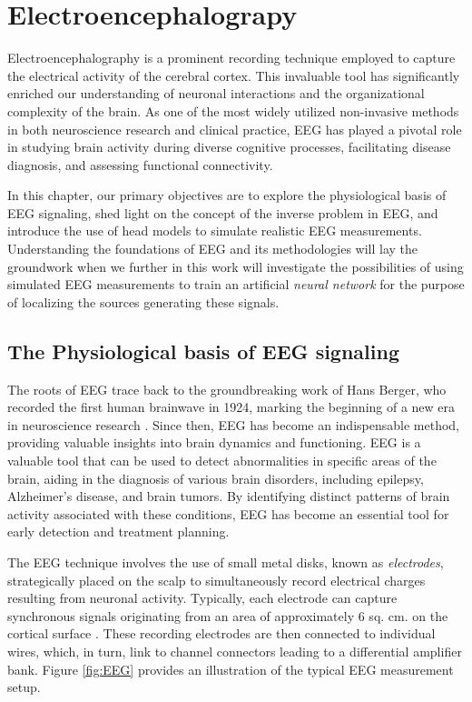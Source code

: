 \documentclass[a4paper, UKenglish, 11pt]{uiomaster}
\begin{document}
\chapter{Electroencephalograpy} \label{chap:eeg}
Electroencephalography is a prominent recording technique employed to capture the electrical activity of the cerebral cortex. This invaluable tool has significantly enriched our understanding of neuronal interactions and the organizational complexity of the brain. As one of the most widely utilized non-invasive methods in both neuroscience research and clinical practice, EEG has played a pivotal role in studying brain activity during diverse cognitive processes, facilitating disease diagnosis, and assessing functional connectivity.

In this chapter, our primary objectives are to explore the physiological basis of EEG signaling, shed light on the concept of the inverse problem in EEG, and introduce the use of head models to simulate realistic EEG measurements. Understanding the foundations of EEG and its methodologies will lay the groundwork when we further in this work will investigate the possibilities of using simulated EEG measurements to train an artificial \emph{neural network} for the purpose of localizing the sources generating these signals. 

\section{The Physiological basis of EEG signaling}
The roots of EEG trace back to the groundbreaking work of Hans Berger, who recorded the first human brainwave in 1924, marking the beginning of a new era in neuroscience research \cite{wiki:electroencephalography}. Since then, EEG has become an indispensable method, providing valuable insights into brain dynamics and functioning. EEG is a valuable tool that can be used to detect abnormalities in specific areas of the brain, aiding in the diagnosis of various brain disorders, including epilepsy, Alzheimer's disease, and brain tumors. By identifying distinct patterns of brain activity associated with these conditions, EEG has become an essential tool for early detection and treatment planning.

The EEG technique involves the use of small metal disks, known as \emph{electrodes}, strategically placed on the scalp to simultaneously record electrical charges resulting from neuronal activity. Typically, each electrode can capture synchronous signals originating from an area of approximately 6 sq. cm. on the cortical surface \cite{bromfield2006introduction}. These recording electrodes are then connected to individual wires, which, in turn, link to channel connectors leading to a differential amplifier bank. Figure \ref{fig:EEG} provides an illustration of the typical EEG measurement setup.
\end{document}
